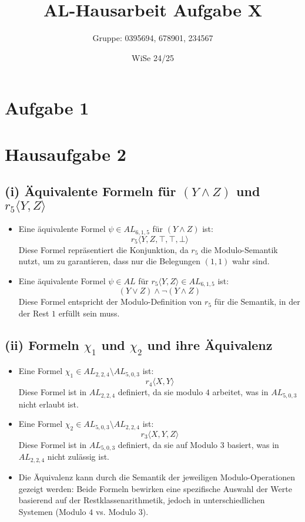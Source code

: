 \documentclass[12pt,a4paper]{article}
\title{AL-Hausarbeit Aufgabe X}
\author{Gruppe: 0395694, 678901, 234567}
\date{WiSe 24/25}
\begin{document}
\maketitle
\section*{Aufgabe 1}

\section*{Hausaufgabe 2}

\subsection*{(i) Äquivalente Formeln für $(Y \land Z)$ und $r_5 \langle Y, Z \rangle$}
\begin{itemize}
    \item Eine äquivalente Formel $\psi \in AL_{6,1,5}$ für $(Y \land Z)$ ist:
    \[
    r_5 \langle Y, Z, \top, \top, \bot \rangle
    \]
    Diese Formel repräsentiert die Konjunktion, da $r_5$ die Modulo-Semantik nutzt, um zu garantieren, dass nur die Belegungen $(1, 1)$ wahr sind.
    
    \item Eine äquivalente Formel $\psi \in AL$ für $r_5 \langle Y, Z \rangle \in AL_{6,1,5}$ ist:
    \[
    (Y \lor Z) \land \neg (Y \land Z)
    \]
    Diese Formel entspricht der Modulo-Definition von $r_5$ für die Semantik, in der der Rest $1$ erfüllt sein muss.
\end{itemize}

\subsection*{(ii) Formeln $\chi_1$ und $\chi_2$ und ihre Äquivalenz}
\begin{itemize}
    \item Eine Formel $\chi_1 \in AL_{2,2,4} \setminus AL_{5,0,3}$ ist:
    \[
    r_4 \langle X, Y \rangle
    \]
    Diese Formel ist in $AL_{2,2,4}$ definiert, da sie modulo $4$ arbeitet, was in $AL_{5,0,3}$ nicht erlaubt ist.

    \item Eine Formel $\chi_2 \in AL_{5,0,3} \setminus AL_{2,2,4}$ ist:
    \[
    r_3 \langle X, Y, Z \rangle
    \]
    Diese Formel ist in $AL_{5,0,3}$ definiert, da sie auf Modulo $3$ basiert, was in $AL_{2,2,4}$ nicht zulässig ist.

    \item Die Äquivalenz kann durch die Semantik der jeweiligen Modulo-Operationen gezeigt werden: Beide Formeln bewirken eine spezifische Auswahl der Werte basierend auf der Restklassenarithmetik, jedoch in unterschiedlichen Systemen (Modulo $4$ vs. Modulo $3$).
\end{itemize}
\end{document}

